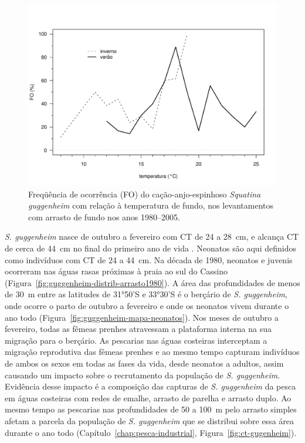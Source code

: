 \documentclass[a4paper,11pt,twoside,showtrims,onecolumn,openright,final]{memoir}
\begin{document}
\begin{figure}
\begin{center}
\includegraphics[width=\textwidth]{GUGGENHEIM_DISTRIBTEMPFUNDO}
\end{center}
\caption[Freqüência de ocorrência (FO) do cação-anjo-espinhoso \emph{Squatina guggenheim}
	 com relação à temperatura de fundo]
	{Freqüência de ocorrência (FO) do cação-anjo-espinhoso \emph{Squatina guggenheim}
	 com relação à temperatura de fundo, nos levantamentos com 
	 arrasto de fundo nos anos 1980--2005.}
\label{fig:guggenheim-distrib-tempfundo}
\end{figure}


\emph{S. guggenheim} nasce de outubro a fevereiro com CT de 24 a 28~cm, e alcança CT de cerca 
de 44~cm no final do primeiro ano de vida \citep{silva1996}. %
Neonatos são aqui definidos como indivíduos com  CT de 24 a 44~cm. 
Na década de 1980, neonatos e juvenis ocorreram nas águas 
rasas próximas à praia ao sul do Cassino (Figura~\ref{fig:guggenheim-distrib-arrasto1980}).  %
A área das profundidades de menos de 30~m entre as latitudes de 31°50'S e 33°30'S é o berçário 
de \emph{S. guggenheim}, onde ocorre o parto de outubro a fevereiro 
e onde os neonatos vivem durante o ano todo (Figura~\ref{fig:guggenheim-mapa-neonatos}). %
Nos meses de outubro a fevereiro, todas as fêmeas prenhes atravessam a 
plataforma interna na sua migração para o berçário. As pescarias nas águas costeiras 
interceptam a migração reprodutiva das fêmeas prenhes e ao mesmo tempo capturam 
indivíduos de ambos os sexos em todas as fases da vida, desde neonatos a adultos, 
assim causando um impacto sobre o recrutamento da população de \emph{S. guggenheim}. 
Evidência desse impacto é a composição das capturas de \emph{S. guggenheim} da pesca 
em águas costeiras com redes de emalhe, arrasto de parelha e arrasto duplo. 
Ao mesmo tempo as pescarias nas profundidades de 50 a 100~m pelo arrasto simples
afetam a parcela da população de \emph{S. guggenheim} que se distribui sobre 
essa área durante o ano todo (Capítulo~\ref{chap:pesca-industrial}, Figura~\ref{fig:ct-gugenheim}).  %
\end{document}
